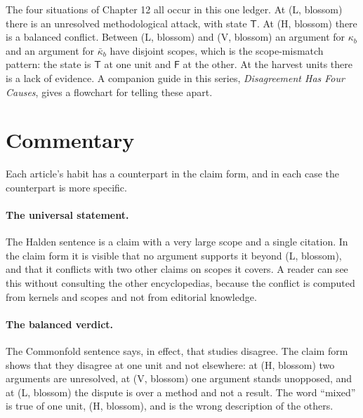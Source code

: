 \documentclass[11pt]{article}
\begin{document}
The four situations of Chapter 12 all occur in this one ledger. At (L, blossom) there is an unresolved methodological attack, with state $\mathsf T$. At (H, blossom) there is a balanced conflict. Between (L, blossom) and (V, blossom) an argument for $\kappa_b$ and an argument for $\bar\kappa_b$ have disjoint scopes, which is the scope-mismatch pattern: the state is $\mathsf T$ at one unit and $\mathsf F$ at the other. At the harvest units there is a lack of evidence. A companion guide in this series, \emph{Disagreement Has Four Causes}, gives a flowchart for telling these apart.

\section{Commentary}\label{sec:commentary}

Each article's habit has a counterpart in the claim form, and in each case the counterpart is more specific.

\paragraph{The universal statement.} The Halden sentence is a claim with a very large scope and a single citation. In the claim form it is visible that no argument supports it beyond (L, blossom), and that it conflicts with two other claims on scopes it covers. A reader can see this without consulting the other encyclopedias, because the conflict is computed from kernels and scopes and not from editorial knowledge.

\paragraph{The balanced verdict.} The Commonfold sentence says, in effect, that studies disagree. The claim form shows that they disagree at one unit and not elsewhere: at (H, blossom) two arguments are unresolved, at (V, blossom) one argument stands unopposed, and at (L, blossom) the dispute is over a method and not a result. The word ``mixed'' is true of one unit, (H, blossom), and is the wrong description of the others.
\end{document}
